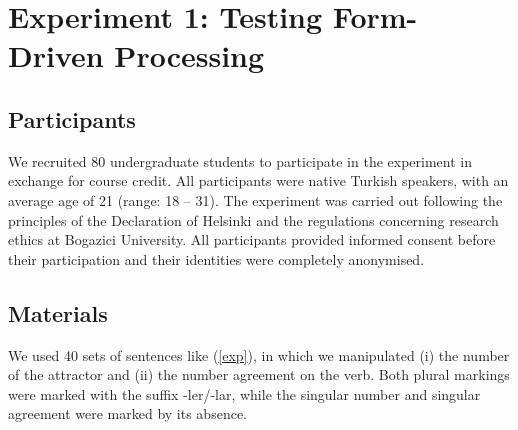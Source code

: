 \documentclass[
  authoryear,
  3p]{elsarticle}
\begin{document}
\section{Experiment 1: Testing Form-Driven
Processing}\label{experiment-1-testing-form-driven-processing}

\subsection{Participants}\label{participants}

We recruited 80 undergraduate students to participate in the experiment
in exchange for course credit. All participants were native Turkish
speakers, with an average age of 21 (range: 18 -- 31). The experiment
was carried out following the principles of the Declaration of Helsinki
and the regulations concerning research ethics at Bogazici University.
All participants provided informed consent before their participation
and their identities were completely anonymised.

\subsection{Materials}\label{materials}

We used 40 sets of sentences like (\ref{exp}), in which we manipulated
(i) the number of the attractor and (ii) the number agreement on the
verb. Both plural markings were marked with the suffix -ler/-lar, while
the singular number and singular agreement were marked by its absence.

\begin{exe}
\ex \label{exp}
\begin{xlist}
\end{xlist}
\end{exe}
\end{document}

